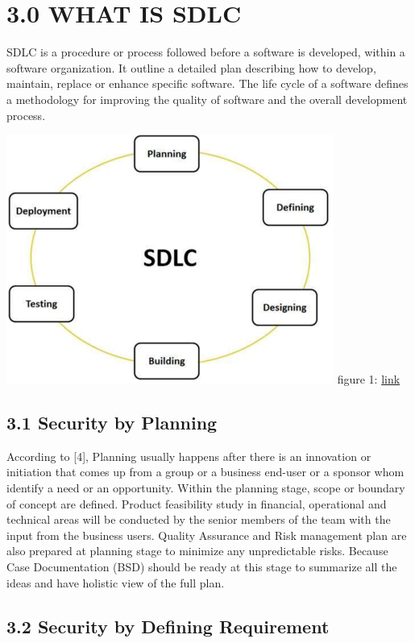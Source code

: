 \documentclass[12pt]{extreport}
\begin{document}
\newpage
\section*{3.0	WHAT IS SDLC}
SDLC is a procedure or process followed before a software is developed, within a software organization. It outline a detailed plan describing how to develop, maintain, replace or enhance specific software. The life cycle of a software defines a methodology for improving the quality of software and the overall development process.

\includegraphics*{image1}
\label{image1} figure 1:
\href{https://www.tutorialspoint.com/sdlc/sdlc_tutorial.pdf}{link}

\subsection*{3.1	Security by Planning}

According to [4], Planning usually happens after there is an innovation or initiation that comes up from a group or a business end-user or a sponsor whom identify a need or an opportunity. Within the planning stage, scope or boundary of concept are defined. Product feasibility study in financial, operational and technical areas will be conducted by the senior members of the team with the input from the business users. Quality Assurance and Risk management plan are also prepared at planning stage to minimize any unpredictable risks. Because Case Documentation (BSD) should be ready at this stage to summarize all the ideas and have holistic view of the full plan.

\subsection*{3.2	Security by Defining Requirement }
\end{document}
